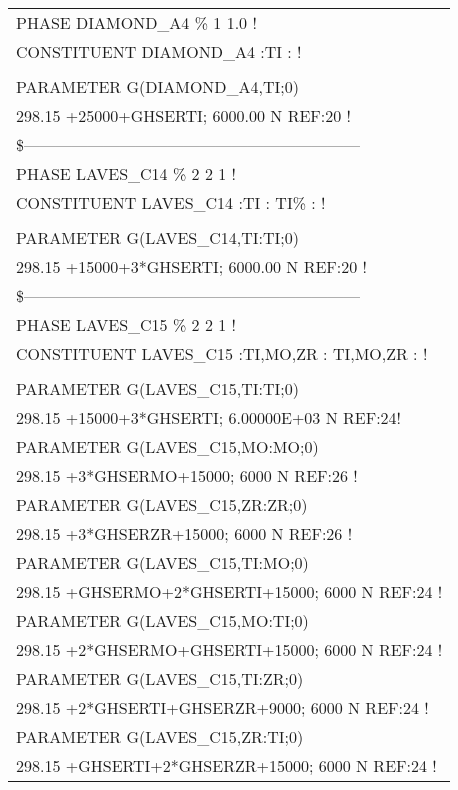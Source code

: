 \begin{longtable}[H]{ l l l }
	\multicolumn{3}{l}{PHASE DIAMOND\_A4  \%  1  1.0  !}\\
	\multicolumn{3}{l}{CONSTITUENT DIAMOND\_A4  :TI :  !}\\
	& & \\
	PARAMETER G(DIAMOND\_A4,TI;0) & & \\
	\multicolumn{3}{l}{298.15 +25000+GHSERTI; 6000.00 N REF:20 !}\\
	\multicolumn{3}{l}{\$---------------------------------------------------------------}\\
	\multicolumn{3}{l}{PHASE LAVES\_C14  \%  2 2   1 !}\\
	\multicolumn{3}{l}{CONSTITUENT LAVES\_C14  :TI : TI\% :  !}\\
	& & \\
	PARAMETER G(LAVES\_C14,TI:TI;0) & &\\
	\multicolumn{3}{l}{298.15 +15000+3*GHSERTI; 6000.00 N REF:20 !}\\
	\multicolumn{3}{l}{\$---------------------------------------------------------------}\\
	\multicolumn{3}{l}{PHASE LAVES\_C15  \%  2 2   1 !}\\
	\multicolumn{3}{l}{CONSTITUENT LAVES\_C15  :TI,MO,ZR : TI,MO,ZR :  !}\\
	& & \\
	PARAMETER G(LAVES\_C15,TI:TI;0) & & \\
	\multicolumn{3}{l}{298.15 +15000+3*GHSERTI; 6.00000E+03   N REF:24!}\\
	PARAMETER G(LAVES\_C15,MO:MO;0) & & \\
	\multicolumn{3}{l}{298.15 +3*GHSERMO+15000; 6000 N REF:26 !}\\
	PARAMETER G(LAVES\_C15,ZR:ZR;0) & & \\
	\multicolumn{3}{l}{298.15 +3*GHSERZR+15000; 6000 N  REF:26 !}\\
	PARAMETER G(LAVES\_C15,TI:MO;0) & & \\ 
	\multicolumn{3}{l}{298.15 +GHSERMO+2*GHSERTI+15000; 6000 N REF:24 !}\\
	PARAMETER G(LAVES\_C15,MO:TI;0) & & \\
	\multicolumn{3}{l}{298.15 +2*GHSERMO+GHSERTI+15000; 6000 N REF:24 !}\\
	PARAMETER G(LAVES\_C15,TI:ZR;0) & & \\
	\multicolumn{3}{l}{298.15 +2*GHSERTI+GHSERZR+9000; 6000 N REF:24 !}\\	 	 
	PARAMETER G(LAVES\_C15,ZR:TI;0) & & \\ 
	\multicolumn{3}{l}{298.15 +GHSERTI+2*GHSERZR+15000; 6000 N REF:24 !}\\

\end{longtable}
